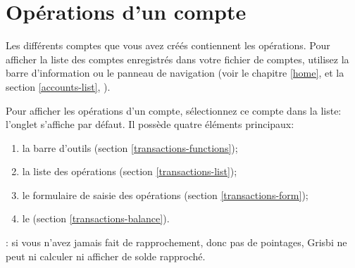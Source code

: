 
\chapter{Opérations d'un compte\label{transactions}}

Les différents comptes que vous avez créés contiennent les opérations. Pour afficher la liste des comptes enregistrés dans votre fichier de comptes, utilisez la barre d'information ou le panneau de navigation (voir le chapitre \vref{home},  et la section \vref{accounts-list}, ).

Pour afficher les opérations d'un compte, sélectionnez ce compte dans la liste: l'onglet  s'affiche par défaut. Il possède quatre éléments principaux:

\begin{enumerate}
	\item la barre d'outils (section \vref{transactions-functions});
	\item la liste des opérations (section \vref{transactions-list});
	\item le formulaire de saisie des opérations (section \vref{transactions-form});
	\item le  (section \vref{transactions-balance}).
\end{enumerate}

\Note{}: si vous n'avez jamais fait de rapprochement, donc pas de pointages, Grisbi ne peut ni calculer ni afficher de solde rapproché.

